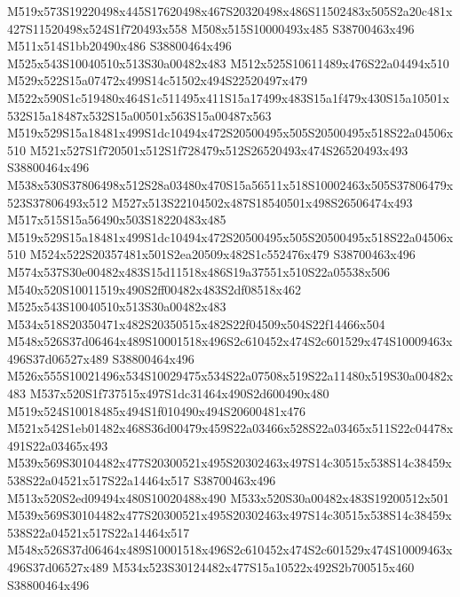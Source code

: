 \documentclass{article}
\begin{document}
\begin{multicols}{2}
M519x573S19220498x445S17620498x467S20320498x486S11502483x505S2a20c481x427S11520498x524S1f720493x558 M508x515S10000493x485 S38700463x496 M511x514S1bb20490x486 S38800464x496 M525x543S10040510x513S30a00482x483 M512x525S10611489x476S22a04494x510 M529x522S15a07472x499S14c51502x494S22520497x479 M522x590S1c519480x464S1c511495x411S15a17499x483S15a1f479x430S15a10501x532S15a18487x532S15a00501x563S15a00487x563 M519x529S15a18481x499S1dc10494x472S20500495x505S20500495x518S22a04506x510 M521x527S1f720501x512S1f728479x512S26520493x474S26520493x493 S38800464x496 M538x530S37806498x512S28a03480x470S15a56511x518S10002463x505S37806479x523S37806493x512 M527x513S22104502x487S18540501x498S26506474x493 M517x515S15a56490x503S18220483x485 M519x529S15a18481x499S1dc10494x472S20500495x505S20500495x518S22a04506x510 M524x522S20357481x501S2ea20509x482S1c552476x479 S38700463x496 M574x537S30e00482x483S15d11518x486S19a37551x510S22a05538x506 M540x520S10011519x490S2ff00482x483S2df08518x462 M525x543S10040510x513S30a00482x483 M534x518S20350471x482S20350515x482S22f04509x504S22f14466x504 M548x526S37d06464x489S10001518x496S2c610452x474S2c601529x474S10009463x496S37d06527x489 S38800464x496 M526x555S10021496x534S10029475x534S22a07508x519S22a11480x519S30a00482x483 M537x520S1f737515x497S1dc31464x490S2d600490x480 M519x524S10018485x494S1f010490x494S20600481x476 M521x542S1eb01482x468S36d00479x459S22a03466x528S22a03465x511S22c04478x491S22a03465x493 M539x569S30104482x477S20300521x495S20302463x497S14c30515x538S14c38459x538S22a04521x517S22a14464x517 S38700463x496 M513x520S2ed09494x480S10020488x490 M533x520S30a00482x483S19200512x501 M539x569S30104482x477S20300521x495S20302463x497S14c30515x538S14c38459x538S22a04521x517S22a14464x517 M548x526S37d06464x489S10001518x496S2c610452x474S2c601529x474S10009463x496S37d06527x489 M534x523S30124482x477S15a10522x492S2b700515x460 S38800464x496





\end{multicols}
\end{document}
